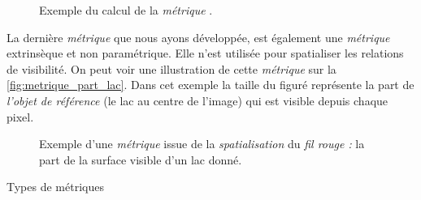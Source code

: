 \begin{figure}
  \centering
  
  \caption{Exemple du calcul de la \emph{métrique}
    \protect{}.}
  \label{fig:metrique_temps_marche}
\end{figure}


La dernière \emph{métrique} que nous ayons
développée, est également une \emph{métrique}
extrinsèque et non paramétrique. Elle n'est utilisée pour spatialiser
les relations de visibilité.
%
On peut voir une illustration de cette \emph{métrique} sur la
\autoref{fig:metrique_part_lac}. Dans cet exemple la taille du figuré
représente la part de \emph{l'objet de référence} (le lac au centre de
l'image) qui est visible depuis chaque pixel.

\begin{figure}
  \centering
  
  \caption{Exemple d'une \emph{métrique} issue de la
    \emph{spatialisation} du \emph{fil rouge :} la part de la surface
    visible d'un lac donné.}
  \label{fig:metrique_part_lac}
\end{figure}

\begin{table}
  \centering
  
  \caption{Types de métriques}
  \label{fig:type_metriques}
\end{table}

